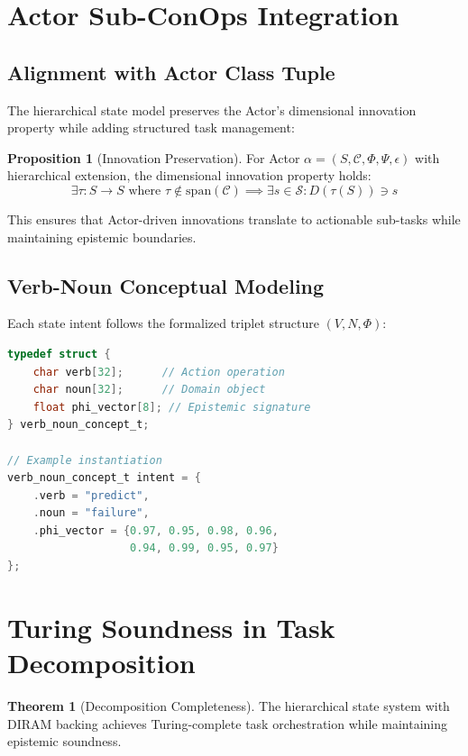 \documentclass[11pt,conference]{IEEEtran}
\theoremstyle{definition}
\newtheorem{theorem}{Theorem}
\newtheorem{proposition}{Proposition}
\newcommand{\states}{\mathcal{S}}
\begin{document}
\section{Actor Sub-ConOps Integration}

\subsection{Alignment with Actor Class Tuple}

The hierarchical state model preserves the Actor's dimensional innovation property while adding structured task management:

\begin{proposition}[Innovation Preservation]
For Actor $\alpha = (S, \mathcal{C}, \Phi, \Psi, \epsilon)$ with hierarchical extension, the dimensional innovation property holds:
\[\exists \tau : S \rightarrow S \text{ where } \tau \notin \text{span}(\mathcal{C}) \implies \exists s \in \states : D(\tau(S)) \ni s\]
\end{proposition}

This ensures that Actor-driven innovations translate to actionable sub-tasks while maintaining epistemic boundaries.

\subsection{Verb-Noun Conceptual Modeling}

Each state intent follows the formalized triplet structure $(V, N, \Phi)$:

\begin{lstlisting}[language=C,caption={Verb-noun concept implementation}]
typedef struct {
    char verb[32];      // Action operation
    char noun[32];      // Domain object  
    float phi_vector[8]; // Epistemic signature
} verb_noun_concept_t;

// Example instantiation
verb_noun_concept_t intent = {
    .verb = "predict",
    .noun = "failure",
    .phi_vector = {0.97, 0.95, 0.98, 0.96, 
                   0.94, 0.99, 0.95, 0.97}
};
\end{lstlisting}

\section{Turing Soundness in Task Decomposition}

\begin{theorem}[Decomposition Completeness]
The hierarchical state system with DIRAM backing achieves Turing-complete task orchestration while maintaining epistemic soundness.
\end{theorem}
\end{document}
